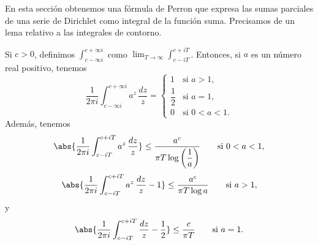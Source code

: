\documentclass[12pt,a4paper]{book}
\begin{document}
    En esta sección obtenemos una fórmula de Perron que expresa las sumas parciales de una
    serie de Dirichlet como integral de la función suma. Precisamos de un lema relativo a las
    integrales de contorno.

    \begin{lema}\label{lem:11-4}
        Si $c>0$, definimos $\int_{c-\infty i}^{c+\infty i}$ como
        $\lim_{T\to\infty}\int_{c-iT}^{c+iT}$. Entonces, si $a$ es un número real positivo,
        tenemos
        \begin{equation*}
            \frac{1}{2\pi i}\int_{c-\infty i}^{c+\infty i}a^{z}\,\frac{dz}{z}=
            \begin{cases}
                1&\text{si }a>1,\\
                \dfrac{1}{2}&\text{si }a=1,\\[1.5ex]
                0&\text{si }0<a<1.
            \end{cases}
        \end{equation*}
        Además, tenemos
        \begin{equation}\label{eq:11-20}
            \abs{\frac{1}{2\pi i}\int_{c-iT}^{c+iT}a^{z}\,\frac{dz}{z}}\leq\frac{a^{c}}{\pi T\log\left(\dfrac{1}{a}\right)}\qquad\text{si }0<a<1,
        \end{equation}
        \begin{equation}\label{eq:11-21}
            \abs{\frac{1}{2\pi i}\int_{c-iT}^{c+iT}a^{z}\,\frac{dz}{z}-1}\leq\frac{a^{c}}{\pi T\log a}\qquad\text{si }a>1,
        \end{equation}
        y
        \begin{equation}\label{eq:11-22}
            \abs{\frac{1}{2\pi i}\int_{c-iT}^{c+iT}\frac{dz}{z}-\frac{1}{2}}\leq\frac{c}{\pi T}\qquad\text{si }a=1.
        \end{equation}
    \end{lema}
\end{document}
